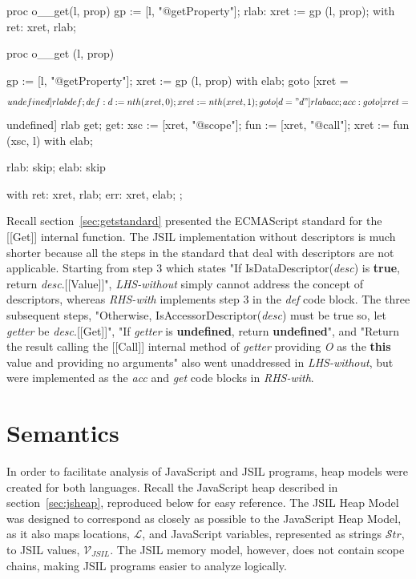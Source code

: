 \documentclass[a4paper,11pt,twoside]{report}
\begin{document}
\begin{minipage}{.45\textwidth}
\begin{lstjsil}
proc o__get(l, prop) {
          gp := [l, "@getProperty"];
    rlab: xret := gp (l, prop);
}
with
{
    ret: xret, rlab;
}
\end{lstjsil}
\end{minipage}%
\hfill
\begin{minipage}{.50\textwidth}
\begin{lstjsil}
proc o__get (l, prop) {
			gp := [l, "@getProperty"];
			xret := gp (l, prop) with elab;	
			goto [xret = $$undefined] rlab def;
			
	def:	d := nth (xret, 0);
			xret := nth (xret, 1);
			goto [d = "d"] rlab acc;
			
	acc:	goto [xret = $$undefined] rlab get;
	get:	xsc := [xret, "@scope"];
			fun := [xret, "@call"];
			xret := fun (xsc, l) with elab;
			
	rlab:	skip;
	elab:	skip
}
with
{
    ret: xret, rlab;
    err: xret, elab;
};
\end{lstjsil}
\end{minipage}

Recall section~\ref{sec:getstandard} presented the ECMAScript standard for the [[Get]] internal function. The JSIL implementation without descriptors is much shorter because all the steps in the standard that deal with descriptors are not applicable. Starting from step 3 which states "If IsDataDescriptor(\textit{desc}) is \textbf{true}, return \textit{desc}.[[Value]]", \textit{LHS-without} simply cannot address the concept of descriptors, whereas \textit{RHS-with} implements step 3 in the \textit{def} code block. The three subsequent steps, "Otherwise, IsAccessorDescriptor(\textit{desc}) must be true so, let \textit{getter} be \textit{desc}.[[Get]]", "If \textit{getter} is \textbf{undefined}, return \textbf{undefined}", and "Return the result calling the [[Call]] internal method of \textit{getter} providing \textit{O} as the \textbf{this} value and providing no arguments" also went unaddressed in \textit{LHS-without}, but were implemented as the \textit{acc} and \textit{get} code blocks in \textit{RHS-with}.

\section{Semantics}
In order to facilitate analysis of JavaScript and JSIL programs, heap models were created for both languages. Recall the JavaScript heap described in section~\ref{sec:jsheap}, reproduced below for easy reference. The JSIL Heap Model was designed to correspond as closely as possible to the JavaScript Heap Model, as it also maps locations, $\mathcal{L}$, and JavaScript variables, represented as strings $\mathcal{S}tr$, to JSIL values, $\mathcal{V}_{JSIL}$. The JSIL memory model, however, does not contain scope chains, making JSIL programs easier to analyze logically.
\end{document}

